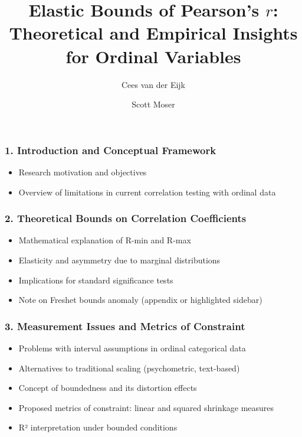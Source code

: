 \documentclass[
  12pt,
]{article}
\title{Elastic Bounds of Pearson's \(r\): Theoretical and Empirical
Insights for Ordinal Variables}
\author{Cees van der Eijk \and Scott Moser}
\date{}
\providecommand{\tightlist}{%
  \setlength{\itemsep}{0pt}\setlength{\parskip}{0pt}}\usepackage{longtable,booktabs,array}
\theoremstyle{plain}
\theoremstyle{definition}
\renewcommand*\contentsname{Table of contents}
\newcommand\contentsname{Table of contents}
\theoremstyle{remark}
\begin{document}
\maketitle

\renewcommand*\contentsname{Table of contents}
{
\hypersetup{linkcolor=}
\setcounter{tocdepth}{3}
\tableofcontents
}

\subsubsection{\texorpdfstring{1. \textbf{Introduction and Conceptual
Framework}}{1. Introduction and Conceptual Framework}}\label{introduction-and-conceptual-framework}

\begin{itemize}
\tightlist
\item
  Research motivation and objectives
\item
  Overview of limitations in current correlation testing with ordinal
  data
\end{itemize}

\subsubsection{\texorpdfstring{2. \textbf{Theoretical Bounds on
Correlation
Coefficients}}{2. Theoretical Bounds on Correlation Coefficients}}\label{theoretical-bounds-on-correlation-coefficients}

\begin{itemize}
\tightlist
\item
  Mathematical explanation of R-min and R-max
\item
  Elasticity and asymmetry due to marginal distributions
\item
  Implications for standard significance tests
\item
  Note on Freshet bounds anomaly (appendix or highlighted sidebar)
\end{itemize}

\subsubsection{\texorpdfstring{3. \textbf{Measurement Issues and Metrics
of
Constraint}}{3. Measurement Issues and Metrics of Constraint}}\label{measurement-issues-and-metrics-of-constraint}

\begin{itemize}
\tightlist
\item
  Problems with interval assumptions in ordinal categorical data
\item
  Alternatives to traditional scaling (psychometric, text-based)
\item
  Concept of boundedness and its distortion effects
\item
  Proposed metrics of constraint: linear and squared shrinkage measures
\item
  R² interpretation under bounded conditions
\end{itemize}
\end{document}
